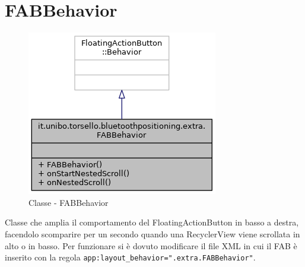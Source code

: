 \section{FABBehavior}
\begin{figure}[ph]
	\centering
	\includegraphics[width=0.6\linewidth]{img/uml/class/classit_1_1unibo_1_1torsello_1_1bluetoothpositioning_1_1extra_1_1FABBehavior__inherit__graph.png}
	\caption{Classe - FABBehavior}
\end{figure}

Classe che amplia il comportamento del FloatingActionButton in basso a destra, facendolo scomparire per un secondo quando una RecyclerView viene scrollata in alto o in basso.
Per funzionare si è dovuto modificare il file XML in cui il FAB è inserito con la regola \texttt{app:layout\_behavior=".extra.FABBehavior"}.